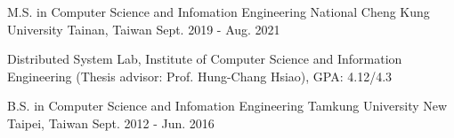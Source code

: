 

\begin{cventries}

  \cventry
    {M.S. in Computer Science and Infomation Engineering} %
    {National Cheng Kung University} %
    {Tainan, Taiwan} %
    {Sept. 2019 - Aug. 2021} %
    {
      \begin{cvitems} %
        \item {Distributed System Lab, Institute of Computer Science and Information Engineering (Thesis advisor: Prof. Hung-Chang Hsiao), GPA: 4.12/4.3}
      \end{cvitems}
    }

  \cventry
    {B.S. in Computer Science and Infomation Engineering} %
    {Tamkung University} %
    {New Taipei, Taiwan} %
    {Sept. 2012 - Jun. 2016} %

\end{cventries}
